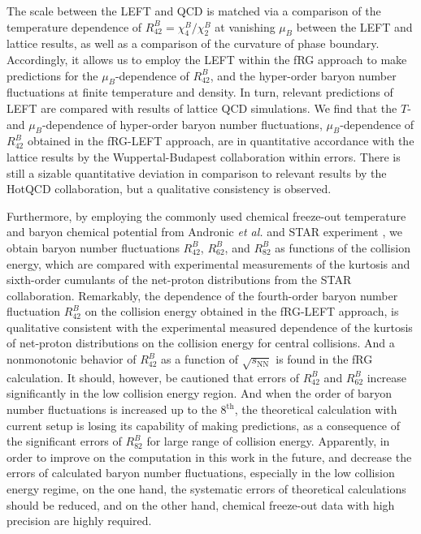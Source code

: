 \documentclass[%
reprint,
superscriptaddress,
showpacs,preprintnumbers,
 amsmath,amssymb,
 aps,
prd,
]{revtex4-1}
\begin{document}
The scale between the LEFT and QCD is matched via a comparison of the temperature dependence of $R^{B}_{42}=\chi^{B}_{4}/\chi^{B}_{2}$ at vanishing $\mu_B$ between the LEFT and lattice results, as well as a comparison of the curvature of phase boundary. Accordingly, it allows us to employ the LEFT within the fRG approach to make predictions for the $\mu_B$-dependence of $R^{B}_{42}$, and the hyper-order baryon number fluctuations at finite temperature and density. In turn, relevant predictions of LEFT are compared with results of lattice QCD simulations. We find that the $T$- and $\mu_B$-dependence of hyper-order baryon number fluctuations, $\mu_B$-dependence of $R^{B}_{42}$ obtained in the fRG-LEFT approach, are in quantitative accordance with the lattice results by the Wuppertal-Budapest collaboration within errors. There is still a sizable quantitative deviation in comparison to relevant results by the HotQCD collaboration, but a qualitative consistency is observed.

Furthermore, by employing the commonly used chemical freeze-out temperature and baryon chemical potential from Andronic {\it et al.} \cite{Andronic:2017pug} and STAR experiment \cite{Adamczyk:2017iwn}, we obtain baryon number fluctuations $R^{B}_{42}$, $R^{B}_{62}$, and $R^{B}_{82}$ as functions of the collision energy, which are compared with experimental measurements of the kurtosis and sixth-order cumulants of the net-proton distributions from the STAR collaboration. Remarkably, the dependence of the fourth-order baryon number fluctuation $R^{B}_{42}$ on the collision energy obtained in the fRG-LEFT approach, is qualitative consistent with the experimental measured dependence of the kurtosis of net-proton distributions on the collision energy for central collisions. And a nonmonotonic behavior of $R^{B}_{42}$ as a function of $\sqrt{s_{\mathrm{NN}}}$ is found in the fRG calculation. It should, however, be cautioned that errors of $R^{B}_{42}$ and $R^{B}_{62}$ increase significantly in the low collision energy region. And when the order of baryon number fluctuations is increased up to the $8^{\mathrm{th}}$, the theoretical calculation with current setup is losing its capability of making predictions, as a consequence of the significant errors of $R^{B}_{82}$ for large range of collision energy. Apparently, in order to improve on the computation in this work in the future, and decrease the errors of calculated baryon number fluctuations, especially in the low collision energy regime, on the one hand, the systematic errors of theoretical calculations should be reduced, and on the other hand, chemical freeze-out data with high precision are highly required.
\end{document}
